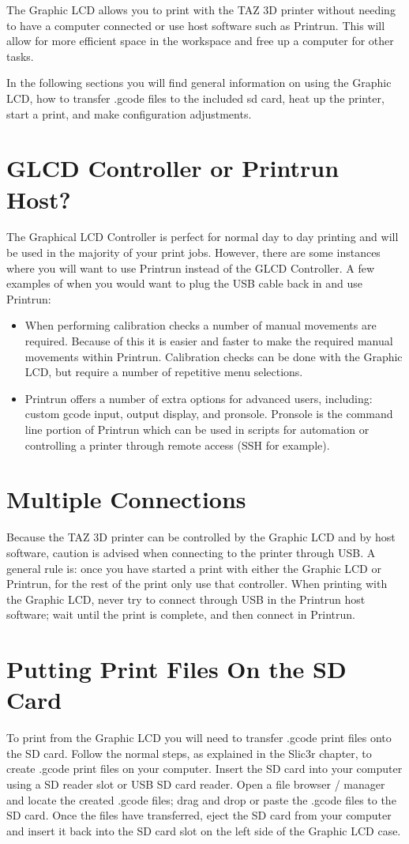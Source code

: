 
The Graphic LCD allows you to print with the TAZ 3D printer without needing to have a computer connected or use host software such as Printrun. This will allow for more efficient space in the workspace and free up a computer for other tasks.

In the following sections you will find general information on using the Graphic LCD, how to transfer .gcode files to the included sd card, heat up the printer, start a print, and make configuration adjustments.

\section{GLCD Controller or Printrun Host?}
\label{sec:Graphic LCD or Printrun Host?}
The Graphical LCD Controller is perfect for normal day to day printing and will be used in the majority of your print jobs. However, there are some instances where you will want to use Printrun instead of the GLCD Controller. A few examples of when you would want to plug the USB cable back in and use Printrun:
\begin{itemize}
	\item When performing calibration checks a number of manual movements are required. Because of this it is easier and faster to make the required manual movements within Printrun. Calibration checks can be done with the Graphic LCD, but require a number of repetitive menu selections.
	\item Printrun offers a number of extra options for advanced users, including: custom gcode input, output display, and pronsole. Pronsole is the command line portion of Printrun which can be used in scripts for automation or controlling a printer through remote access (SSH for example).
\end{itemize}

\section{Multiple Connections}
Because the TAZ 3D printer can be controlled by the Graphic LCD and by host software, caution is advised when connecting to the printer through USB. A general rule is: once you have started a print with either the Graphic LCD or Printrun, for the rest of the print only use that controller. When printing with the Graphic LCD, never try to connect through USB in the Printrun host software; wait until the print is complete, and then connect in Printrun.

\section{Putting Print Files On the SD Card}
To print from the Graphic LCD you will need to transfer .gcode print files onto the SD card. Follow the normal steps, as explained in the Slic3r chapter, to create .gcode print files on your computer. Insert the SD card into your computer using a SD reader slot or USB SD card reader. Open a file browser / manager and locate the created .gcode files; drag and drop or paste the .gcode files to the SD card. Once the files have transferred, eject the SD card from your computer and insert it back into the SD card slot on the left side of the Graphic LCD case.

